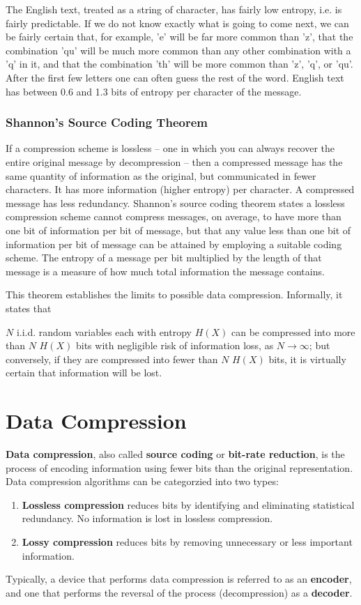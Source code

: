 \documentclass{article}
\begin{document}
  The English text, treated as a string of character, has fairly low entropy, i.e. is fairly predictable. If we do not know exactly what is going to come next, we can be fairly certain that, for example, 'e' will be far more common than 'z', that the combination 'qu' will be much more common than any other combination with a 'q' in it, and that the combination 'th' will be more common than 'z', 'q', or 'qu'. After the first few letters one can often guess the rest of the word. English text has between 0.6 and 1.3 bits of entropy per character of the message. 

  \subsubsection{Shannon's Source Coding Theorem}
  If a compression scheme is lossless – one in which you can always recover the entire original message by decompression – then a compressed message has the same quantity of information as the original, but communicated in fewer characters. It has more information (higher entropy) per character. A compressed message has less redundancy. Shannon's source coding theorem states a lossless compression scheme cannot compress messages, on average, to have more than one bit of information per bit of message, but that any value less than one bit of information per bit of message can be attained by employing a suitable coding scheme. The entropy of a message per bit multiplied by the length of that message is a measure of how much total information the message contains.

  This theorem establishes the limits to possible data compression. Informally, it states that 
  \begin{center}
      $N$ i.i.d. random variables each with entropy $H(X)$ can be compressed into more than $N$ $H(X)$ bits with negligible risk of information loss, as $N \rightarrow \infty$; but conversely, if they are compressed into fewer than $N$ $H(X)$ bits, it is virtually certain that information will be lost. 
  \end{center}

\section{Data Compression}

  \textbf{Data compression}, also called \textbf{source coding} or  \textbf{bit-rate reduction}, is the process of encoding information using fewer bits than the original representation. Data compression algorithms can be categorzied into two types: 
  \begin{enumerate}
      \item \textbf{Lossless compression} reduces bits by identifying and eliminating statistical redundancy. No information is lost in lossless compression. 
      \item \textbf{Lossy compression} reduces bits by removing unnecessary or less important information.
  \end{enumerate}
  Typically, a device that performs data compression is referred to as an \textbf{encoder}, and one that performs the reversal of the process (decompression) as a \textbf{decoder}. 
\end{document}
